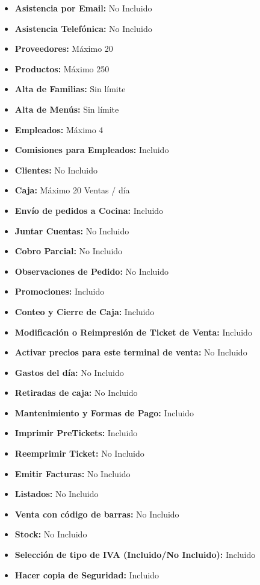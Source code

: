 \documentclass[12pt,a4paper]{article}
\begin{document}
\begin{itemize}
\item \textbf {Asistencia por Email:} No Incluido
\item \textbf {Asistencia Telefónica:} No Incluido
\item \textbf {Proveedores:} Máximo 20
\item \textbf {Productos:} Máximo 250
\item \textbf {Alta de Familias:} Sin límite
\item \textbf {Alta de Menús:} Sin límite
\item \textbf {Empleados:} Máximo 4
\item \textbf {Comisiones para Empleados:} Incluido
\item \textbf {Clientes:} No Incluido
\item \textbf {Caja:} Máximo 20 Ventas / día
\item \textbf {Envío de pedidos a Cocina:} Incluido
\item \textbf {Juntar Cuentas:} No Incluido
\item \textbf {Cobro Parcial:} No Incluido
\item \textbf {Observaciones de Pedido:} No Incluido
\item \textbf {Promociones:} Incluido
\item \textbf {Conteo y Cierre de Caja:} Incluido
\item \textbf {Modificación o Reimpresión de Ticket de Venta:} Incluido
\item \textbf {Activar precios para este terminal de venta:} No Incluido
\item \textbf {Gastos del día:} No Incluido
\item \textbf {Retiradas de caja:} No Incluido
\item \textbf {Mantenimiento y Formas de Pago:} Incluido
\item \textbf {Imprimir PreTickets:} Incluido
\item \textbf {Reemprimir Ticket:} No Incluido
\item \textbf {Emitir Facturas:} No Incluido
\item \textbf {Listados:} No Incluido
\item \textbf {Venta con código de barras:} No Incluido
\item \textbf {Stock:} No Incluido
\item \textbf {Selección de tipo de IVA (Incluido/No Incluido):} Incluido
\item \textbf {Hacer copia de Seguridad:} Incluido

\end{itemize}
\end{document}

